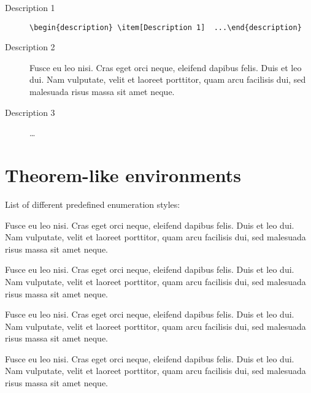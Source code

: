 \documentclass[a4paper,UKenglish,cleveref, autoref]{lipics-v2019}
\begin{document}
\begin{description}
\item[Description 1] \verb|\begin{description} \item[Description 1]  ...\end{description}|
\item[Description 2] Fusce eu leo nisi. Cras eget orci neque, eleifend dapibus felis. Duis et leo dui. Nam vulputate, velit et laoreet porttitor, quam arcu facilisis dui, sed malesuada risus massa sit amet neque.
\item[Description 3]  \dots
\end{description}

\section{Theorem-like environments}\label{sec:theorem-environments}

List of different predefined enumeration styles:

\begin{theorem}\label{testenv-theorem}
Fusce eu leo nisi. Cras eget orci neque, eleifend dapibus felis. Duis et leo dui. Nam vulputate, velit et laoreet porttitor, quam arcu facilisis dui, sed malesuada risus massa sit amet neque.
\end{theorem}

\begin{lemma}\label{testenv-lemma}
Fusce eu leo nisi. Cras eget orci neque, eleifend dapibus felis. Duis et leo dui. Nam vulputate, velit et laoreet porttitor, quam arcu facilisis dui, sed malesuada risus massa sit amet neque.
\end{lemma}

\begin{corollary}\label{testenv-corollary}
Fusce eu leo nisi. Cras eget orci neque, eleifend dapibus felis. Duis et leo dui. Nam vulputate, velit et laoreet porttitor, quam arcu facilisis dui, sed malesuada risus massa sit amet neque.
\end{corollary}

\begin{proposition}\label{testenv-proposition}
Fusce eu leo nisi. Cras eget orci neque, eleifend dapibus felis. Duis et leo dui. Nam vulputate, velit et laoreet porttitor, quam arcu facilisis dui, sed malesuada risus massa sit amet neque.
\end{proposition}
\end{document}
